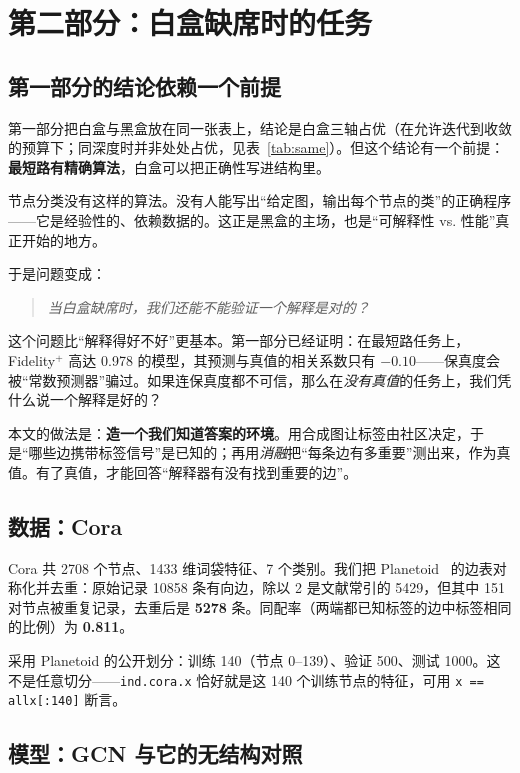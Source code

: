 \section{第二部分：白盒缺席时的任务}\label{sec:node}

\subsection{第一部分的结论依赖一个前提}

第一部分把白盒与黑盒放在同一张表上，结论是白盒三轴占优（在允许迭代到收敛的预算下；同深度时并非处处占优，见表~\ref{tab:same}）。但这个结论有一个前提：\textbf{最短路有精确算法}，白盒可以把正确性写进结构里。

节点分类没有这样的算法。没有人能写出“给定图，输出每个节点的类”的正确程序——它是经验性的、依赖数据的。这正是黑盒的主场，也是“可解释性 vs. 性能”真正开始的地方。

于是问题变成：

\begin{quote}
\emph{当白盒缺席时，我们还能不能验证一个解释是对的？}
\end{quote}

这个问题比“解释得好不好”更基本。第一部分已经证明：在最短路任务上，Fidelity$^+$ 高达 0.978 的模型，其预测与真值的相关系数只有 $-0.10$——保真度会被“常数预测器”骗过。如果连保真度都不可信，那么在\emph{没有真值}的任务上，我们凭什么说一个解释是好的？

本文的做法是：\textbf{造一个我们知道答案的环境}。用合成图让标签由社区决定，于是“哪些边携带标签信号”是已知的；再用\emph{消融}把“每条边有多重要”测出来，作为真值。有了真值，才能回答“解释器有没有找到重要的边”。

\subsection{数据：Cora}

Cora 共 2708 个节点、1433 维词袋特征、7 个类别。我们把 Planetoid~\cite{sen2008collective} 的边表对称化并去重：原始记录 10858 条有向边，除以 2 是文献常引的 5429，但其中 151 对节点被重复记录，去重后是 \textbf{5278} 条。同配率（两端都已知标签的边中标签相同的比例）为 \textbf{0.811}。

采用 Planetoid 的公开划分：训练 140（节点 0--139）、验证 500、测试 1000。这不是任意切分——\texttt{ind.cora.x} 恰好就是这 140 个训练节点的特征，可用 \texttt{x == allx[:140]} 断言。

\subsection{模型：GCN 与它的无结构对照}

